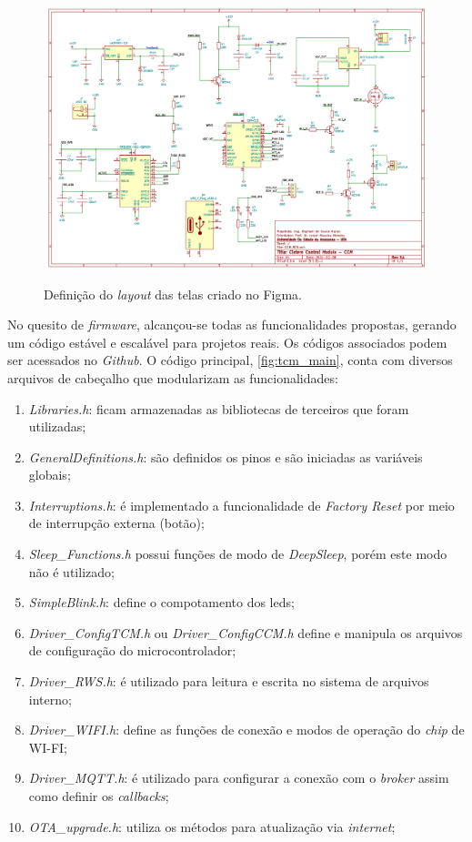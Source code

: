 \begin{figure}[H]
	\centering
	\caption{Definição do \textit{layout} das telas criado no Figma.}
	\includegraphics[width=1\textwidth]{figuras/kicad_ccm.png}
	\label{fig:kicad_ccm}
\end{figure}



No quesito de \textit{firmware}, alcançou-se todas as funcionalidades propostas, gerando um código estável e escalável para projetos reais. Os códigos associados podem ser acessados no \textit{Github}. O código principal, \autoref{fig:tcm_main}, conta com diversos arquivos de cabeçalho que modularizam as funcionalidades: 

\begin{enumerate}
	\item \textit{Libraries.h}: ficam armazenadas as bibliotecas de terceiros que foram utilizadas;
	\item \textit{GeneralDefinitions.h}: são definidos os pinos e são iniciadas as variáveis globais;
	\item \textit{Interruptions.h}: é implementado a funcionalidade de \textit{Factory Reset} por meio de interrupção externa (botão);
	\item \textit{Sleep\_Functions.h} possui funções de modo de \textit{DeepSleep}, porém este modo não é utilizado;
	\item  \textit{SimpleBlink.h}: define o compotamento dos leds;
	\item \textit{Driver\_ConfigTCM.h} ou \textit{Driver\_ConfigCCM.h} define e manipula os arquivos de configuração do microcontrolador;
	\item \textit{Driver\_RWS.h}: é utilizado para leitura e escrita no sistema de arquivos interno;
	\item \textit{Driver\_WIFI.h}: define as funções de conexão e modos de operação do \textit{chip} de WI-FI;
	\item \textit{Driver\_MQTT.h}: é utilizado para configurar a conexão com o \textit{broker} assim como definir os \textit{callbacks};
	\item \textit{OTA\_upgrade.h}: utiliza os métodos para atualização via \textit{internet};
	
\end{enumerate}


